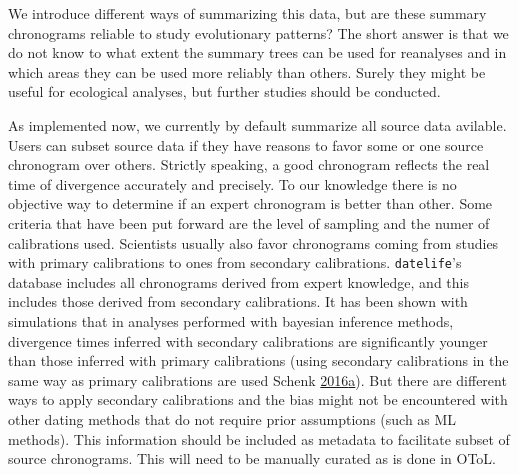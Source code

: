 \documentclass[]{article}
\begin{document}
We introduce different ways of summarizing this data, but are these summary chronograms reliable to study evolutionary patterns? The short answer is that we do not know to what extent the summary trees can be used for reanalyses and in which areas they can be used more reliably than others. Surely they might be useful for ecological analyses, but further studies should be conducted.

As implemented now, we currently by default summarize all source data avilable. Users can subset source data if they have reasons to favor some or one source chronogram over others. Strictly speaking, a good chronogram reflects the real time of divergence accurately and precisely. To our knowledge there is no objective way to determine if an expert chronogram is better than other. Some criteria that have been put forward are the level of sampling and the numer of calibrations used. Scientists usually also favor chronograms coming from studies with primary calibrations to ones from secondary calibrations. \texttt{datelife}'s database includes all chronograms derived from expert knowledge, and this includes those derived from secondary calibrations. It has been shown with simulations that in analyses performed with bayesian inference methods, divergence times inferred with secondary calibrations are significantly younger than those inferred with primary calibrations (using secondary calibrations in the same way as primary calibrations are used Schenk \protect\hyperlink{ref-schenk2016sec}{2016}\protect\hyperlink{ref-schenk2016sec}{a}). But there are different ways to apply secondary calibrations and the bias might not be encountered with other dating methods that do not require prior assumptions (such as ML methods). This information should be included as metadata to facilitate subset of source chronograms. This will need to be manually curated as is done in OToL.
\end{document}
